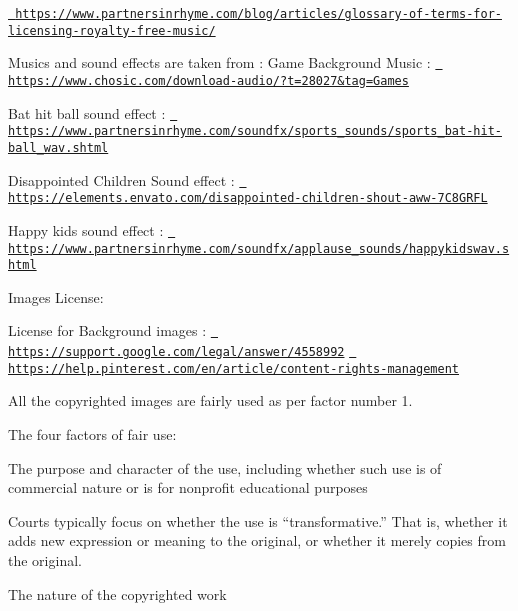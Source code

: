 \href{https://www.partnersinrhyme.com/blog/articles/glossary-of-terms-for-licensing-royalty-free-music/}{\texttt{ https\+://www.\+partnersinrhyme.\+com/blog/articles/glossary-\/of-\/terms-\/for-\/licensing-\/royalty-\/free-\/music/}}

Musics and sound effects are taken from \+: Game Background Music \+: \href{https://www.chosic.com/download-audio/?t=28027&tag=Games}{\texttt{ https\+://www.\+chosic.\+com/download-\/audio/?t=28027\&tag=\+Games}}

Bat hit ball sound effect \+: \href{https://www.partnersinrhyme.com/soundfx/sports_sounds/sports_bat-hit-ball_wav.shtml}{\texttt{ https\+://www.\+partnersinrhyme.\+com/soundfx/sports\+\_\+sounds/sports\+\_\+bat-\/hit-\/ball\+\_\+wav.\+shtml}}

Disappointed Children Sound effect \+: \href{https://elements.envato.com/disappointed-children-shout-aww-7C8GRFL}{\texttt{ https\+://elements.\+envato.\+com/disappointed-\/children-\/shout-\/aww-\/7\+C8\+GRFL}}

Happy kids sound effect \+: \href{https://www.partnersinrhyme.com/soundfx/applause_sounds/happykidswav.shtml}{\texttt{ https\+://www.\+partnersinrhyme.\+com/soundfx/applause\+\_\+sounds/happykidswav.\+shtml}} 


Images License\+:

License for Background images \+: \href{https://support.google.com/legal/answer/4558992}{\texttt{ https\+://support.\+google.\+com/legal/answer/4558992}} \href{https://help.pinterest.com/en/article/content-rights-management}{\texttt{ https\+://help.\+pinterest.\+com/en/article/content-\/rights-\/management}}

All the copyrighted images are fairly used as per factor number 1.

The four factors of fair use\+:
\begin{DoxyEnumerate}
\item The purpose and character of the use, including whether such use is of commercial nature or is for nonprofit educational purposes
\end{DoxyEnumerate}

Courts typically focus on whether the use is “transformative.\+” That is, whether it adds new expression or meaning to the original, or whether it merely copies from the original.


\begin{DoxyEnumerate}
\item The nature of the copyrighted work
\end{DoxyEnumerate}

